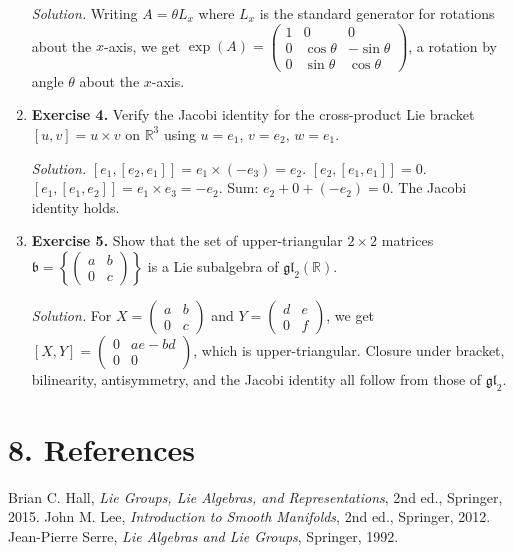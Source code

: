 \begin{enumerate}[leftmargin=*,itemsep=0.9em]
\emph{Solution.} Writing $A=\theta L_x$ where $L_x$ is the standard generator for rotations about the $x$-axis, we get $\exp(A)=\begin{pmatrix}1&0&0\\0&\cos\theta&-\sin\theta\\0&\sin\theta&\cos\theta\end{pmatrix}$, a rotation by angle $\theta$ about the $x$-axis.

\item \textbf{Exercise 4.} Verify the Jacobi identity for the cross-product Lie bracket $[u,v]=u\times v$ on $\mathbb{R}^3$ using $u=e_1$, $v=e_2$, $w=e_1$.

\emph{Solution.} $[e_1,[e_2,e_1]]=e_1\times(-e_3)=e_2$. $[e_2,[e_1,e_1]]=0$. $[e_1,[e_1,e_2]]=e_1\times e_3=-e_2$. Sum: $e_2+0+(-e_2)=0$. The Jacobi identity holds.

\item \textbf{Exercise 5.} Show that the set of upper-triangular $2\times 2$ matrices $\mathfrak{b}=\left\{\begin{pmatrix}a&b\\0&c\end{pmatrix}\right\}$ is a Lie subalgebra of $\mathfrak{gl}_2(\mathbb{R})$.

\emph{Solution.} For $X=\begin{pmatrix}a&b\\0&c\end{pmatrix}$ and $Y=\begin{pmatrix}d&e\\0&f\end{pmatrix}$, we get $[X,Y]=\begin{pmatrix}0&ae-bd\\0&0\end{pmatrix}$, which is upper-triangular. Closure under bracket, bilinearity, antisymmetry, and the Jacobi identity all follow from those of $\mathfrak{gl}_2$.

\end{enumerate}
\section*{8. References}

\begin{thebibliography}{9}
 Brian C. Hall, \emph{Lie Groups, Lie Algebras, and Representations}, 2nd ed., Springer, 2015.
 John M. Lee, \emph{Introduction to Smooth Manifolds}, 2nd ed., Springer, 2012.
 Jean-Pierre Serre, \emph{Lie Algebras and Lie Groups}, Springer, 1992.
\end{thebibliography}